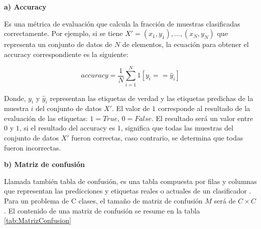 \textbf{a) Accuracy}

Es una métrica de evaluación que calcula la fracción de muestras clasificadas correctamente. Por ejemplo, si se tiene $ {X}' = (x_{1},y_{1}), ... , (x_{N},y_{N})$ que representa un conjunto de datos de $N$ de elementos, la ecuación para obtener el accuracy correspondiente es la siguiente:

\begin{equation}
    accuracy = \frac{1}{N} \sum_{i=1}^{N} 1[y_{i} == \hat{y}_{i}]
\end{equation}

Donde, $ y_{i} $ y $ \hat{y}_{i} $ representan las etiquetas de verdad y las etiquetas predichas de la muestra $i$ del conjunto de datos $ {X}' $. El valor de $1$ corresponde al resultado de la evaluación de las etiquetas: $ 1 = True $, $ 0 = False $. El resultado será un valor entre $ 0 $ y $ 1 $, si el resultado del accuracy es $ 1 $, significa que todas las muestras del conjunto de datos $ {X}' $ fueron correctas, caso contrario, se determina que todas fueron incorrectas.

\textbf{b) Matriz de confusión}

Llamada también tabla de confusión, es una tabla compuesta por filas y columnas que representan las predicciones y etiquetas reales o actuales de un clasificador \cite{patterson2017deep}. Para un problema de C clases, el tamaño de matriz de confusión $M$ será de $C \times C$. El contenido de una matriz de confusión se resume en la tabla \ref{tab:MatrizConfusion}

